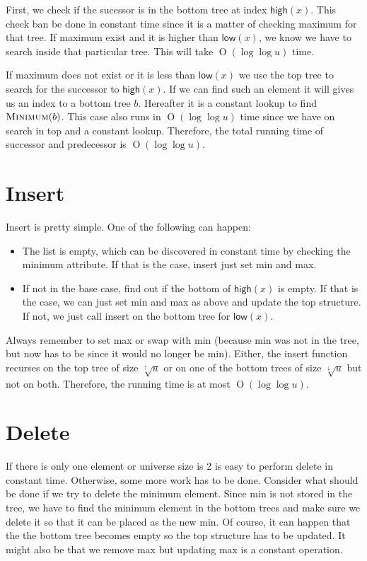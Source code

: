 \documentclass[oneside,11pt,openright]{report}
\newcommand{\BigO}[1]{\ensuremath{\operatorname{O}\left(#1\right)}}
\newcommand{\Minimum}{\textsc{Minimum}}
\newcommand{\HIGH}{\textsf{high}}
\newcommand{\LOW}{\textsf{low}}
\newcommand{\HIGHER}{\sqrt[\uparrow]{u}}
\newcommand{\LOWER}{\sqrt[\downarrow]{u}}
\begin{document}
First, we check if the sucessor is in the bottom tree at index $\HIGH(x)$. This check ban be done in constant time since it is a matter of checking maximum for that tree. If maximum exist and it is higher than $\LOW(x)$, we know we have to search inside that particular tree. This will take $\BigO{\log\log u}$ time.

If maximum does not exist or it is less than $\LOW(x)$ we use the top tree to search for the successor to $\HIGH(x)$. If we can find such an element it will gives us an index to a bottom tree $b$. Hereafter it is a constant lookup to find $\Minimum(b)$. This case also runs in $\BigO{\log\log u}$ time since we have on search in top and a constant lookup. Therefore, the total running time of successor and predecessor is $\BigO{\log\log u}$.

\section{Insert}

Insert is pretty simple. One of the following can happen:

\begin{itemize}
\item The list is empty, which can be discovered in constant time by checking the minimum attribute. If that is the case, insert just set min and max.
\item If not in the base case, find out if the bottom of $\HIGH(x)$ is empty. If that is the case, we can just set min and max as above and update the top structure. If not, we just call insert on the bottom tree for $\LOW(x)$.
\end{itemize}

Always remember to set max or swap with min (because min was not in the tree, but now has to be since it would no longer be min). Either, the insert function recurses on the top tree of size $\HIGHER$ or on one of the bottom trees of size $\LOWER$ but not on both. Therefore, the running time is at most $\BigO{\log \log u}$.

\section{Delete}

If there is only one element or universe size is 2 is easy to perform delete in constant time. Otherwise, some more work has to be done. Consider what should be done if we try to delete the minimum element. Since min is not stored in the tree, we have to find the minimum element in the bottom trees and make sure we delete it so that it can be placed as the new min. Of course, it can happen that the the bottom tree becomes empty so the top structure has to be updated. It might also be that we remove max but updating max is a constant operation.
\end{document}
